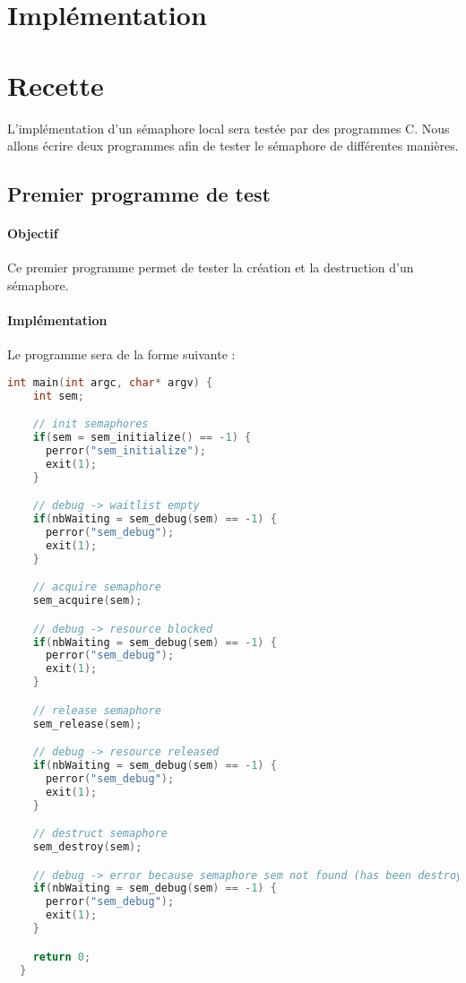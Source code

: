 \documentclass[12pt]{article}
\begin{document}
\newpage
\section{Implémentation}
\newpage
\section{Recette}
L'implémentation d'un sémaphore local sera testée par des programmes C. Nous allons écrire deux programmes afin de tester le sémaphore de différentes manières.
\subsection{Premier programme de test}
  \paragraph{Objectif\\}
  Ce premier programme permet de tester la création et la destruction d'un sémaphore.

  \paragraph{Implémentation\\}
  Le programme sera de la forme suivante :
  \begin{lstlisting}[language=C]
  int main(int argc, char* argv) {
    int sem;

    // init semaphores
    if(sem = sem_initialize() == -1) {
      perror("sem_initialize");
      exit(1);
    }

    // debug -> waitlist empty
    if(nbWaiting = sem_debug(sem) == -1) {
      perror("sem_debug");
      exit(1);
    }

    // acquire semaphore
    sem_acquire(sem);

    // debug -> resource blocked
    if(nbWaiting = sem_debug(sem) == -1) {
      perror("sem_debug");
      exit(1);
    }

    // release semaphore
    sem_release(sem);

    // debug -> resource released
    if(nbWaiting = sem_debug(sem) == -1) {
      perror("sem_debug");
      exit(1);
    }

    // destruct semaphore
    sem_destroy(sem);

    // debug -> error because semaphore sem not found (has been destroyed)
    if(nbWaiting = sem_debug(sem) == -1) {
      perror("sem_debug");
      exit(1);
    }

    return 0;
  }
  \end{lstlisting}
\end{document}
